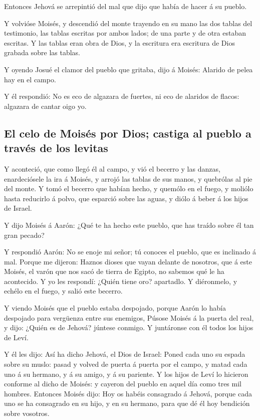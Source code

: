  Entonces Jehová se arrepintió del mal que dijo que había
de hacer á su pueblo.

 Y volvióse Moisés, y descendió del monte trayendo en su
mano las dos tablas del testimonio, las tablas escritas por ambos lados;
de una parte y de otra estaban escritas.  Y las tablas eran
obra de Dios, y la escritura era escritura de Dios grabada sobre las
tablas.

 Y oyendo Josué el clamor del pueblo que gritaba, dijo á
Moisés: Alarido de pelea hay en el campo.

 Y él respondió: No es eco de algazara de fuertes, ni eco
de alaridos de flacos: algazara de cantar oigo yo.

\hypertarget{el-celo-de-moisuxe9s-por-dios-castiga-al-pueblo-a-travuxe9s-de-los-levitas}{%
\subsection{El celo de Moisés por Dios; castiga al pueblo a través de
los
levitas}\label{el-celo-de-moisuxe9s-por-dios-castiga-al-pueblo-a-travuxe9s-de-los-levitas}}

 Y aconteció, que como llegó él al campo, y vió el becerro
y las danzas, enardeciósele la ira á Moisés, y arrojó las tablas de sus
manos, y quebrólas al pie del monte.  Y tomó el becerro que
habían hecho, y quemólo en el fuego, y moliólo hasta reducirlo á polvo,
que esparció sobre las aguas, y diólo á beber á los hijos de Israel.

 Y dijo Moisés á Aarón: ¿Qué te ha hecho este pueblo, que
has traído sobre él tan gran pecado?

 Y respondió Aarón: No se enoje mi señor; tú conoces el
pueblo, que es inclinado á mal.  Porque me dijeron: Haznos
dioses que vayan delante de nosotros, que á este Moisés, el varón que
nos sacó de tierra de Egipto, no sabemos qué le ha acontecido.
 Y yo les respondí: ¿Quién tiene oro? apartadlo. Y
diéronmelo, y echélo en el fuego, y salió este becerro.

 Y viendo Moisés que el pueblo estaba despojado, porque
Aarón lo había despojado para vergüenza entre sus enemigos,
 Púsose Moisés á la puerta del real, y dijo: ¿Quién es de
Jehová? júntese conmigo. Y juntáronse con él todos los hijos de Leví.

 Y él les dijo: Así ha dicho Jehová, el Dios de Israel:
Poned cada uno su espada sobre su muslo: pasad y volved de puerta á
puerta por el campo, y matad cada uno á su hermano, y á su amigo, y á su
pariente.  Y los hijos de Leví lo hicieron conforme al
dicho de Moisés: y cayeron del pueblo en aquel día como tres mil
hombres.  Entonces Moisés dijo: Hoy os habéis consagrado á
Jehová, porque cada uno se ha consagrado en su hijo, y en su hermano,
para que dé él hoy bendición sobre vosotros.

